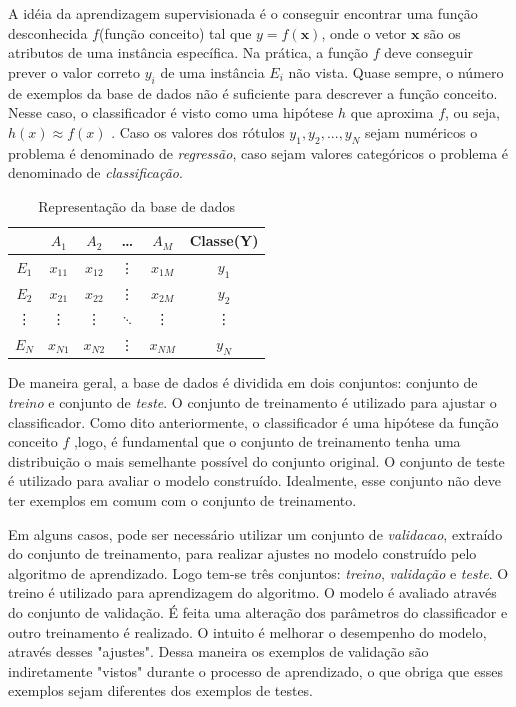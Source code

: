 A idéia da aprendizagem supervisionada é o conseguir encontrar uma função desconhecida $f$(função conceito) tal que $y=f(\mathbf{x})$, onde o vetor $\mathbf{x}$ são os atributos de uma instância específica. Na prática, a função $f$ deve conseguir prever o valor correto $y_i$ de uma instância $E_i$ não vista. Quase sempre, o número de exemplos da base de dados não é suficiente para descrever a função conceito. Nesse caso, o classificador é visto como uma hipótese $h$ que aproxima $f$, ou seja, $h(x)\approx f(x)$ . Caso os valores dos rótulos $y_1,y_2,...,y_N$ sejam numéricos o problema é denominado de \textit{regressão}, caso sejam valores categóricos o problema é denominado de \textit{classificação}. 

\begin{table}[]
	\centering
	\begin{tabular}{c|cccc|c}
		\hline
		& $A_1$ & $A_2$ & \dots & $A_M$  & Classe(Y) \\
		\hline 
		\hline
		$E_1$ & $x_{11}$ & $x_{12}$ & \vdots & $x_{1M}$ & $y_1$ \\
		$E_2$ & $x_{21}$ & $x_{22}$ & \vdots & $x_{2M}$ & $y_2$ \\
		\vdots & \vdots & \vdots &  $\ddots$ & \vdots & \vdots \\
		$E_N$ & $x_{N1}$ & $x_{N2}$ & \vdots & $x_{NM}$ & $y_N$ \\
		\hline
		
		
	\end{tabular}	
	\caption{Representação da base de dados}
	\label{table-dataset}
\end{table}


De maneira geral, a base de dados é dividida em dois conjuntos: conjunto de \textit{treino} e conjunto de \textit{teste}. O conjunto de treinamento é utilizado para ajustar o classificador. Como dito anteriormente, o classificador é uma hipótese da função conceito $f$ ,logo, é fundamental que o conjunto de treinamento tenha uma distribuição o mais semelhante possível do conjunto original.  O conjunto de teste é utilizado para avaliar o modelo construído. Idealmente, esse conjunto não deve ter exemplos em comum com o conjunto de treinamento.

Em alguns casos, pode ser necessário utilizar um conjunto de \textit{validacao}, extraído do conjunto de treinamento, para realizar ajustes no modelo construído pelo algoritmo de aprendizado. Logo tem-se três conjuntos: \textit{treino}, \textit{validação} e \textit{teste}. O treino é utilizado para aprendizagem do algoritmo. O modelo é avaliado através do conjunto de validação. É feita uma alteração dos parâmetros do classificador e outro treinamento é realizado. O intuito é melhorar o desempenho do modelo, através desses "ajustes". Dessa maneira os exemplos de validação são indiretamente "vistos" durante o processo de aprendizado, o que obriga que esses exemplos sejam diferentes dos exemplos de testes.



